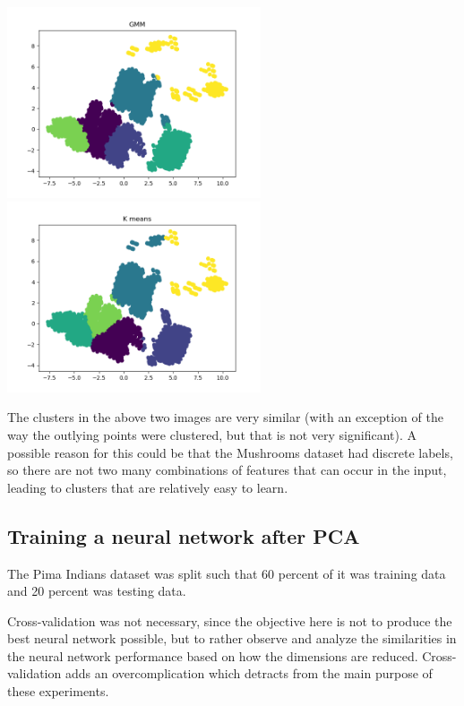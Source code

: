 \documentclass[11pt]{article}
\begin{document}
            \includegraphics[width=7.5cm]{../mushrooms/clustering2/cluster_gmm_pca.png}
            \includegraphics[width=7.5cm]{../mushrooms/clustering2/cluster_km_pca.png}

            The clusters in the above two images are very similar (with an exception
            of the way the outlying points were clustered, but that is not very significant).
            A possible reason for this could be that the Mushrooms dataset had discrete labels,
            so there are not two many combinations of features that can occur in the input,
            leading to clusters that are relatively easy to learn.

            \subsection{Training a neural network after PCA}

            The Pima Indians dataset was split such that 60 percent of it
            was training data and 20 percent was testing data.
            
            Cross-validation was not necessary, since the objective here is not
            to produce the best neural network possible, but to rather observe
            and analyze the similarities in the neural network performance
            based on how the dimensions are reduced. Cross-validation adds an
            overcomplication which detracts from the main purpose of these
            experiments.
            
\end{document}
